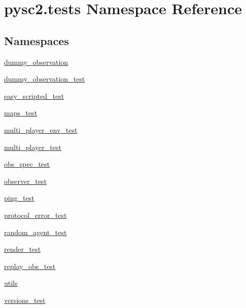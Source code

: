\hypertarget{namespacepysc2_1_1tests}{}\section{pysc2.\+tests Namespace Reference}
\label{namespacepysc2_1_1tests}
\subsection*{Namespaces}
\begin{DoxyCompactItemize}
\item 
 \mbox{\hyperlink{namespacepysc2_1_1tests_1_1dummy__observation}{dummy\+\_\+observation}}
\item 
 \mbox{\hyperlink{namespacepysc2_1_1tests_1_1dummy__observation__test}{dummy\+\_\+observation\+\_\+test}}
\item 
 \mbox{\hyperlink{namespacepysc2_1_1tests_1_1easy__scripted__test}{easy\+\_\+scripted\+\_\+test}}
\item 
 \mbox{\hyperlink{namespacepysc2_1_1tests_1_1maps__test}{maps\+\_\+test}}
\item 
 \mbox{\hyperlink{namespacepysc2_1_1tests_1_1multi__player__env__test}{multi\+\_\+player\+\_\+env\+\_\+test}}
\item 
 \mbox{\hyperlink{namespacepysc2_1_1tests_1_1multi__player__test}{multi\+\_\+player\+\_\+test}}
\item 
 \mbox{\hyperlink{namespacepysc2_1_1tests_1_1obs__spec__test}{obs\+\_\+spec\+\_\+test}}
\item 
 \mbox{\hyperlink{namespacepysc2_1_1tests_1_1observer__test}{observer\+\_\+test}}
\item 
 \mbox{\hyperlink{namespacepysc2_1_1tests_1_1ping__test}{ping\+\_\+test}}
\item 
 \mbox{\hyperlink{namespacepysc2_1_1tests_1_1protocol__error__test}{protocol\+\_\+error\+\_\+test}}
\item 
 \mbox{\hyperlink{namespacepysc2_1_1tests_1_1random__agent__test}{random\+\_\+agent\+\_\+test}}
\item 
 \mbox{\hyperlink{namespacepysc2_1_1tests_1_1render__test}{render\+\_\+test}}
\item 
 \mbox{\hyperlink{namespacepysc2_1_1tests_1_1replay__obs__test}{replay\+\_\+obs\+\_\+test}}
\item 
 \mbox{\hyperlink{namespacepysc2_1_1tests_1_1utils}{utils}}
\item 
 \mbox{\hyperlink{namespacepysc2_1_1tests_1_1versions__test}{versions\+\_\+test}}
\end{DoxyCompactItemize}

